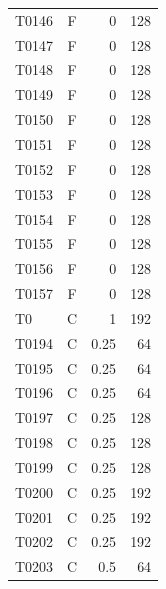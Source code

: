 \documentclass[10pt,letterpaper]{article}
\begin{document}
\begin{minipage}[t]{0.48\textwidth}
\begin{tabular}{lcrr}
T0146 & F & 0 & 128\\
T0147 & F & 0 & 128\\
T0148 & F & 0 & 128\\
T0149 & F & 0 & 128\\
T0150 & F & 0 & 128\\
T0151 & F & 0 & 128\\
T0152 & F & 0 & 128\\
T0153 & F & 0 & 128\\
T0154 & F & 0 & 128\\
T0155 & F & 0 & 128\\
T0156 & F & 0 & 128\\
T0157 & F & 0 & 128\\
T0 & C & 1 & 192\\
T0194 & C & 0.25 & 64\\
T0195 & C & 0.25 & 64\\
T0196 & C & 0.25 & 64\\
T0197 & C & 0.25 & 128\\
T0198 & C & 0.25 & 128\\
T0199 & C & 0.25 & 128\\
T0200 & C & 0.25 & 192\\
T0201 & C & 0.25 & 192\\
T0202 & C & 0.25 & 192\\
T0203 & C & 0.5 & 64\\
\bottomrule\end{tabular}\end{minipage}
\hfill
\end{document}
